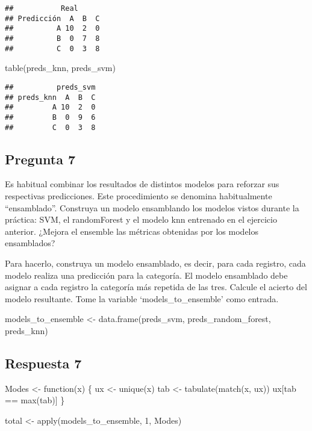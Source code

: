 \documentclass[]{article}
\newenvironment{Shaded}{\begin{snugshade}}{\end{snugshade}}
\newcommand{\KeywordTok}[1]{\textcolor[rgb]{0.94,0.87,0.69}{#1}}
\newcommand{\DecValTok}[1]{\textcolor[rgb]{0.86,0.86,0.80}{#1}}
\newcommand{\StringTok}[1]{\textcolor[rgb]{0.80,0.58,0.58}{#1}}
\newcommand{\ControlFlowTok}[1]{\textcolor[rgb]{0.94,0.87,0.69}{#1}}
\newcommand{\OperatorTok}[1]{\textcolor[rgb]{0.94,0.94,0.82}{#1}}
\newcommand{\NormalTok}[1]{\textcolor[rgb]{0.80,0.80,0.80}{#1}}
\begin{document}
\begin{verbatim}
##           Real
## Predicción  A  B  C
##          A 10  2  0
##          B  0  7  8
##          C  0  3  8
\end{verbatim}

\begin{Shaded}
\begin{Highlighting}[]
\KeywordTok{table}\NormalTok{(preds_knn, preds_svm)}
\end{Highlighting}
\end{Shaded}

\begin{verbatim}
##          preds_svm
## preds_knn  A  B  C
##         A 10  2  0
##         B  0  9  6
##         C  0  3  8
\end{verbatim}

\subsection{Pregunta 7}\label{pregunta-7}

Es habitual combinar los resultados de distintos modelos para reforzar
sus respectivas predicciones. Este procedimiento se denomina
habitualmente ``ensamblado''. Construya un modelo ensamblando los
modelos vistos durante la práctica: SVM, el randomForest y el modelo knn
entrenado en el ejercicio anterior. ¿Mejora el ensemble las métricas
obtenidas por los modelos ensamblados?

Para hacerlo, construya un modelo ensamblado, es decir, para cada
registro, cada modelo realiza una predicción para la categoría. El
modelo ensamblado debe asignar a cada registro la categoría más repetida
de las tres. Calcule el acierto del modelo resultante. Tome la variable
`models\_to\_ensemble' como entrada.

\begin{Shaded}
\begin{Highlighting}[]
\NormalTok{models_to_ensemble <-}\StringTok{ }\KeywordTok{data.frame}\NormalTok{(preds_svm, preds_random_forest, preds_knn)}
\end{Highlighting}
\end{Shaded}

\subsection{Respuesta 7}\label{respuesta-7}

\begin{Shaded}
\begin{Highlighting}[]
\NormalTok{Modes <-}\StringTok{ }\ControlFlowTok{function}\NormalTok{(x) \{}
\NormalTok{  ux <-}\StringTok{ }\KeywordTok{unique}\NormalTok{(x)}
\NormalTok{  tab <-}\StringTok{ }\KeywordTok{tabulate}\NormalTok{(}\KeywordTok{match}\NormalTok{(x, ux))}
\NormalTok{  ux[tab }\OperatorTok{==}\StringTok{ }\KeywordTok{max}\NormalTok{(tab)]}
\NormalTok{\}}

\NormalTok{total <-}\StringTok{ }\KeywordTok{apply}\NormalTok{(models_to_ensemble, }\DecValTok{1}\NormalTok{, Modes)}
\end{Highlighting}
\end{Shaded}
\end{document}
